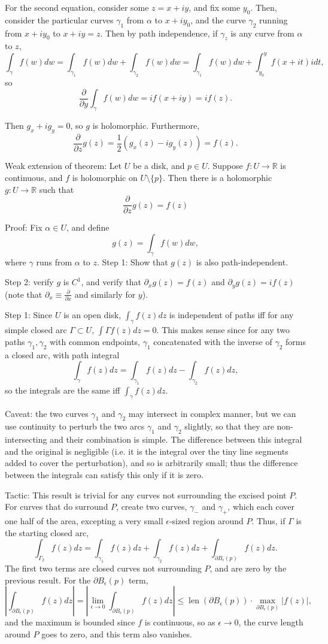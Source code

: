 \documentclass{artikel3}
\newcommand{\pr}[1]{\left(#1\right)}
\newcommand{\abs}[1]{\left|#1\right|}
\newcommand{\complex}{\mathbb{R}}
\newcommand{\del}{\partial}
\begin{document}
For the second equation, consider some $z=x+iy$, and fix some
$y_0$.  Then, consider the particular curves $\gamma_1$ from
$\alpha$ to $x+iy_0$, and the curve $\gamma_2$ running from
$x+iy_0$ to $x+iy=z$.  Then by path independence, if $\gamma_z$
is any curve from $\alpha$ to $z$, \[
	\int_{\gamma}f(w)dw
	= \int_{\gamma_1}f(w)dw + \int_{\gamma_2}f(w)dw
	= \int_{\gamma_1}f(w)dw + \int_{y_0}^{y}f(x+it)idt,
\] so \[
	\frac{\del}{\del y}\int_{\gamma}f(w)dw = if(x+iy)=if(z).
\]

Then $g_x+ig_y=0$, so $g$ is holomorphic.  Furthermore, \[
	\frac{\del}{\del z}g(z)
	= \frac{1}{2}\pr{g_x(z)-ig_y(z)} = f(z).
\]

Weak extension of theorem:
Let $U$ be a disk, and $p\in U$.  Suppose $f:U\to \complex$ is continuous,
and $f$ is holomorphic on $U\setminus\{p\}$.  Then there is a holomorphic $g:U\to\complex$
such that \[
	\frac{\del}{\del z}g(z)=f(z)
\]

Proof: Fix $\alpha\in U$, and define \[
	g(z)=\int_{\gamma} f(w)dw,
\] where $\gamma$ runs from $\alpha$ to $z$.
Step 1: Show that $g(z)$ is also path-independent.

Step 2: verify $g$ is $C^1$, and verify that
$\del_x g(z)=f(z)$ and $\del_y g(z)=if(z)$ (note that
$\del_x\equiv \frac{\del}{\del x}$ and similarly
for $y$).

Step 1:  Since $U$ is an open disk, $\int_\gamma f(z)dz$ is independent of paths
iff for any simple closed arc $\Gamma\subset U$, $\int\Gamma f(z)dz=0$.
This makes sense since for any two paths $\gamma_1,\gamma_2$ with common endpoints,
$\gamma_1$ concatenated with the inverse of $\gamma_2$ forms a closed arc,
with path integral \[
	\int_{\gamma}f(z)dz = \int_{\gamma_1}f(z)dz-\int_{\gamma_2}f(z)dz,
\] so the integrals are the same iff $\int_{\gamma}f(z)dz$.

Caveat: the two curves $\gamma_1$ and $\gamma_2$ may intersect in complex manner, but
we can use continuity to perturb the two arcs $\gamma_1$ and $\gamma_2$ slightly,
so that they are non-intersecting and their combination is simple.  The difference between
this integral and the original is negligible (i.e. it is the integral over the tiny line
segments added to cover the perturbation), and so is arbitrarily small; thus the difference
between the integrals can satisfy this only if it is zero.

Tactic: This result is trivial for any curves not surrounding the excised point $P$.
For curves that do surround $P$, create two curves, $\gamma_-$ and $\gamma_+$, which each
cover one half of the area, excepting a very small $\epsilon$-sized region around $P$.  Thus,
if $\Gamma$ is the starting closed arc, \[
	\int_{\Gamma_2}f(z)dz = \int_{\gamma_1}f(z)dz + \int_{\gamma_2}f(z)dz
		+ \int_{\del B_\epsilon(p)}f(z)dz.
\] The first two terms are closed curves not surrounding $P$, and are zero by the previous result.
For the $\del B_\epsilon(p)$ term, \[
	\abs{\int_{\del B_\epsilon(p)}f(z)dz}
	= \abs{\lim_{\epsilon\to 0}\int_{\del B_\epsilon(p)}f(z)dz}
	\leq \operatorname{len}(\del B_\epsilon(p))\cdot \max_{\del B_\epsilon(p)}\abs{f(z)},
\] and the maximum is bounded since $f$ is continuous, so as $\epsilon\to 0$, the curve
length around $P$ goes to zero, and this term also vanishes.
\end{document}
